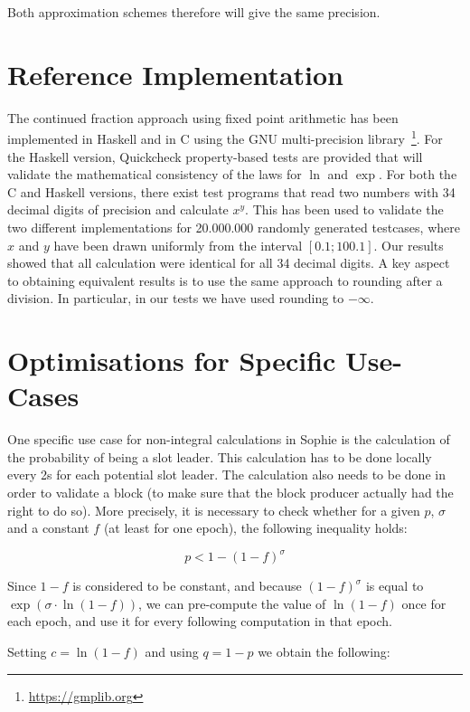 \documentclass[11pt,a4paper,dvipsnames,twosided]{article}
\theoremstyle{definition}
\theoremstyle{definition}
\begin{document}
Both approximation schemes therefore will give the same precision.

\section{Reference Implementation}
\label{sec:refer-impl}

The continued fraction approach using fixed point arithmetic has been
implemented in Haskell and in C using the GNU multi-precision
library~\footnote{\url{https://gmplib.org}}.
%
For the Haskell version, Quickcheck property-based tests are provided that will validate
the mathematical consistency of the laws for $\ln$ and $\exp$.
%
For both the C and Haskell versions, there exist test programs that read
two numbers with 34 decimal digits of precision and calculate
$x^{y}$. This has been used to validate the two different
implementations for 20.000.000 randomly generated testcases, where $x$ and $y$
have been drawn uniformly from the interval $[0.1; 100.1]$. Our results showed that all
calculation were identical for all 34 decimal digits.
A key aspect to obtaining equivalent results is to use the same approach to
rounding after a division. In particular, in our tests we have used rounding to $-\infty$.

\section{Optimisations for Specific Use-Cases}
\label{sec:optim-spec-use}

One specific use case for non-integral calculations in Sophie is the calculation of the
probability of being a slot leader. This calculation has to be done locally every 2s
for each potential slot leader. The calculation also needs to be done in order to
validate a block (to make sure that the block producer actually had the right to
do so).
%
More precisely, it is necessary to check whether for a given $p$, $\sigma$ and a
constant $f$ (at least for one epoch), the following inequality holds:

\begin{equation*}
  p < 1 - {(1 - f)}^{\sigma}
\end{equation*}

Since $1-f$ is considered to be constant, and because ${(1-f)}^{\sigma}$ is equal
to $\exp(\sigma\cdot\ln(1-f))$, we can pre-compute the value of $\ln(1-f)$ once for
each epoch, and use it for every following computation in that epoch.

Setting $c= \ln(1 - f)$ and using $q = 1 - p$ we obtain the following:
\end{document}
